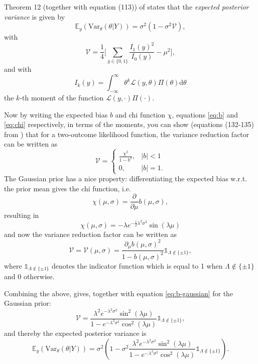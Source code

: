 \documentclass[]{report}
\begin{document}
Theorem 12 (together with equation (113)) of \cite{Koh2020} states that the \textit{expected posterior variance} is given by
\begin{equation}
    \mathbb{E}_y(\text{Var}_{\theta}(\theta | Y)) = \sigma^2(1-\sigma^2\mathcal{V}),
\end{equation}
with
\begin{equation}
    \mathcal{V} = \frac{1}{4}\Bigg[ \sum_{y\in \{0,1\}}\frac{I_1(y)^2}{I_0(y)} - \mu^2\Bigg],
\end{equation}
and with
\begin{equation}
    I_k(y) = \int_{-\infty}^{\infty} \theta^k \mathcal{L}(y, \theta)\Pi(\theta) \text{d}\theta
\end{equation}
the $k$-th moment of the function $\mathcal{L}(y, \cdot)\Pi(\cdot)$.

Now by writing the expected bias $b$ and chi function $\chi$, equations \eqref{eq:b} and \eqref{eq:chi} respectively, in terms of the moments, you can show (equations (132-135) from \cite{Koh2020}) that for a two-outcome likelihood function, the variance reduction factor can be written as
\begin{equation}
    \mathcal{V} = \begin{cases}
        \frac{\chi^2}{1-b^2},   & |b|<1\\
        0,                      & |b|=1.
    \end{cases}
\end{equation}
The Gaussian prior has a nice property: differentiating the expected bias w.r.t. the prior mean gives the chi function, i.e.
\begin{equation}
\label{eq:chi-diff}
    \chi(\mu, \sigma) = \frac{\partial}{\partial\mu}b(\mu, \sigma),
\end{equation}
resulting in
\begin{equation}
\label{eq:chi-gaussian}
    \chi(\mu, \sigma) = - \lambda e^{-\frac{1}{2}\lambda^2\sigma^2}\sin(\lambda\mu)
\end{equation}
and now the variance reduction factor can be written as
\begin{equation}
    \mathcal{V} = \mathcal{V}(\mu, \sigma) = \frac{\partial_{\mu}b(\mu, \sigma)^2}{1 - b(\mu, \sigma)^2} \mathbb{1}_{\Lambda \notin \{\pm1\}},
\end{equation}
where $\mathbb{1}_{\Lambda \notin \{\pm1\}}$ denotes the indicator function which is equal to 1 when $\Lambda \notin \{\pm1\}$ and $0$ otherwise.

Combining the above, gives, together with equation \eqref{eq:b-gaussian} for the Gaussian prior:
\begin{equation}
    \mathcal{V} = \frac{\lambda^2 e^{-\lambda^2\sigma^2} \sin^2(\lambda\mu)}{1-e^{-\lambda^2\sigma^2} \cos^2(\lambda\mu)}\mathbb{1}_{\Lambda \notin \{\pm1\}},
\end{equation}
and thereby the expected posterior variance is
\begin{equation}
    \mathbb{E}_y(\text{Var}_{\theta}(\theta | Y)) = \sigma^2(1-\sigma^2\frac{\lambda^2 e^{-\lambda^2\sigma^2} \sin^2(\lambda\mu)}{1-e^{-\lambda^2\sigma^2} \cos^2(\lambda\mu)}\mathbb{1}_{\Lambda \notin \{\pm1\}}).
\end{equation}
\end{document}
